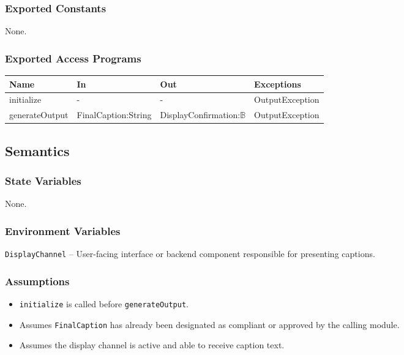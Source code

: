 \documentclass[12pt, titlepage]{article}
\newcommand{\Bool}{\ensuremath{\mathbb{B}}}
\begin{document}
\subsubsection{Exported Constants}
None.

\subsubsection{Exported Access Programs}


\begin{center}
  \begin{tabular}{p{3cm} p{3.5cm} p{4cm} p{4cm}}
  \hline
  \textbf{Name} & \textbf{In} & \textbf{Out} & \textbf{Exceptions} \\
  \hline
  initialize & - & - & OutputException \\
  \hline
  generateOutput & FinalCaption:String & DisplayConfirmation:\Bool & OutputException \\
  \hline
  \end{tabular}
  \end{center}

\subsection{Semantics}

\subsubsection{State Variables}
None.

\subsubsection{Environment Variables}
\texttt{DisplayChannel} -- User-facing interface or backend component responsible for presenting captions.

\subsubsection{Assumptions}
\begin{itemize}
  \item \texttt{initialize} is called before \texttt{generateOutput}.
  \item Assumes \texttt{FinalCaption} has already been designated as compliant or approved by the calling module.
  \item Assumes the display channel is active and able to receive caption text.
\end{itemize}
  
\end{document}
